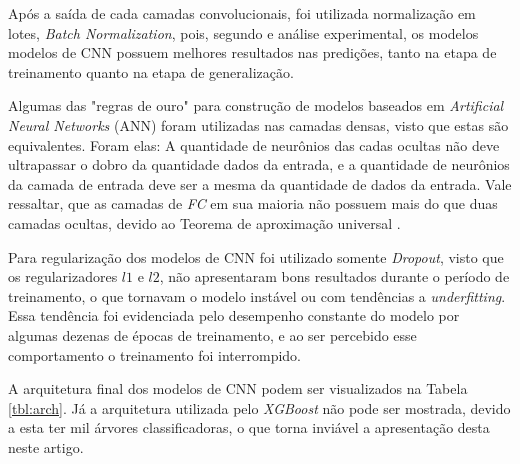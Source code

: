 Após a saída de cada camadas convolucionais, foi utilizada normalização em lotes, \emph{Batch Normalization}, pois, segundo \cite{} e análise experimental, os modelos modelos de CNN possuem melhores resultados nas predições, tanto na etapa de treinamento quanto na etapa de generalização.

Algumas das "regras de ouro" \cite{} para construção de modelos baseados em \emph{Artificial Neural Networks} (ANN) foram utilizadas nas camadas densas, visto que estas são equivalentes. Foram elas: A quantidade de neurônios das cadas ocultas não deve ultrapassar o dobro da quantidade dados da entrada, e a quantidade de neurônios da camada de entrada deve ser a mesma da quantidade de dados da entrada. Vale ressaltar, que as camadas de \emph{FC} em sua maioria não possuem mais do que duas camadas ocultas, devido ao Teorema de aproximação universal \cite{}.

Para regularização dos modelos de CNN foi utilizado somente \emph{Dropout}, visto que os regularizadores $l1$ e $l2$, não apresentaram bons resultados durante o período de treinamento, o que tornavam o modelo instável ou com tendências a \emph{underfitting}. Essa tendência foi evidenciada pelo desempenho constante do modelo por algumas dezenas de épocas de treinamento, e ao ser percebido esse comportamento o treinamento foi interrompido.

A arquitetura final dos modelos de CNN podem ser visualizados na Tabela \ref{tbl:arch}. Já a arquitetura utilizada pelo \emph{XGBoost} não pode ser mostrada, devido a esta ter mil árvores classificadoras, o que torna inviável a apresentação desta neste artigo.


